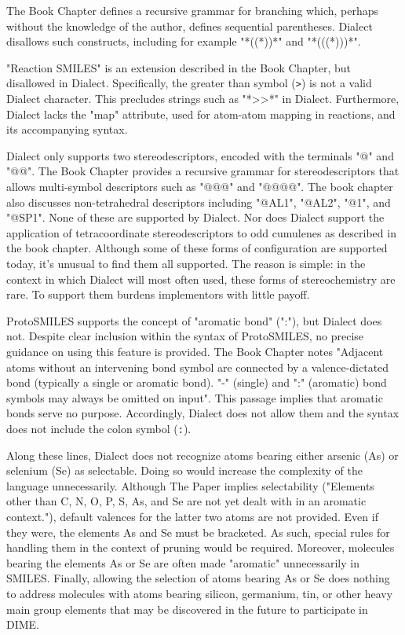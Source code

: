 \documentclass{article}
\def\ttt{\texttt}
\begin{document}
The Book Chapter defines a recursive grammar for branching which, perhaps without the knowledge of the author, defines sequential parentheses.\cite[p. 86]{weininger:2008} Dialect disallows such constructs, including for example "*((*))*" and "*(((*)))*".

"Reaction SMILES" is an extension described in the Book Chapter,\cite[p. 89]{weininger:2008} but disallowed in Dialect. Specifically, the greater than symbol (\ttt{>}) is not a valid Dialect character. This precludes strings such as "*>>*" in Dialect. Furthermore, Dialect lacks the "map" attribute, used for atom-atom mapping in reactions, and its accompanying syntax.

Dialect only supports two stereodescriptors, encoded with the terminals "@" and "@@". The Book Chapter provides a recursive grammar for stereodescriptors that allows multi-symbol descriptors such as "@@@" and "@@@@".\cite[p. 94]{weininger:2008} The book chapter also discusses non-tetrahedral descriptors including "@AL1", "@AL2", "@1", and "@SP1". None of these are supported by Dialect. Nor does Dialect support the application of tetracoordinate stereodescriptors to odd cumulenes as described in the book chapter. Although some of these forms of configuration are supported today, it's unusual to find them all supported. The reason is simple: in the context in which Dialect will most often used, these forms of stereochemistry are rare. To support them burdens implementors with little payoff.

ProtoSMILES supports the concept of "aromatic bond" (":"), but Dialect does not. Despite clear inclusion within the syntax of ProtoSMILES, no precise guidance on using this feature is provided. The Book Chapter notes "Adjacent atoms without an intervening bond symbol are connected by a valence-dictated bond (typically a single or aromatic bond). "-" (single) and ":" (aromatic) bond symbols may always be omitted on input".\cite[p 85]{weininger:2008} This passage implies that aromatic bonds serve no purpose. Accordingly, Dialect does not allow them and the syntax does not include the colon symbol (\ttt{:}).

Along these lines, Dialect does not recognize atoms bearing either arsenic (As) or selenium (Se) as selectable. Doing so would increase the complexity of the language unnecessarily. Although The Paper implies selectability ("Elements other than C, N, O, P, S, As, and Se are not yet dealt with in an aromatic context."),\cite[p. 35]{weininger:1988} default valences for the latter two atoms are not provided. Even if they were, the elements As and Se must be bracketed. As such, special rules for handling them in the context of pruning would be required. Moreover, molecules bearing the elements As or Se are often made "aromatic" unnecessarily in SMILES. Finally, allowing the selection of atoms bearing As or Se does nothing to address molecules with atoms bearing silicon, germanium, tin, or other heavy main group elements that may be discovered in the future to participate in DIME.
\end{document}
